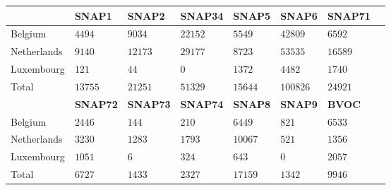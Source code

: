 \begin{tabular}{llllllll}
    \hline \hline
    & \textbf{SNAP1} & \textbf{SNAP2} & \textbf{SNAP34} & \textbf{SNAP5} & \textbf{SNAP6} & \textbf{SNAP71} \\
    \hline
    Belgium & $4494$ & $9034$ & $22152$ & $5549$ & $42809$ & $6592$ \\
    Netherlands & $9140$ & $12173$ & $29177$ & $8723$ & $53535$ & $16589$ \\
    Luxembourg & $121$ & $44$ & $0$ & $1372$ & $4482$ & $1740$ \\
    \hline
    Total & $13755$ & $21251$ & $51329$ & $15644$ & $100826$ & $24921$ \\
    \hline
    & \textbf{SNAP72} & \textbf{SNAP73} & \textbf{SNAP74} & \textbf{SNAP8} & \textbf{SNAP9} & \textbf{BVOC} \\
    \hline
    Belgium & $2446$ & $144$ & $210$ & $6449$ & $821$ & $6533$ \\
    Netherlands & $3230$ & $1283$ & $1793$ & $10067$ & $521$ & $1356$ \\
    Luxembourg & $1051$ & $6$ & $324$ & $643$ & $0$ & $2057$ \\
    \hline
    Total & $6727$ & $1433$ & $2327$ & $17159$ & $1342$ & $9946$ \\
    \hline \hline
\end{tabular}%
